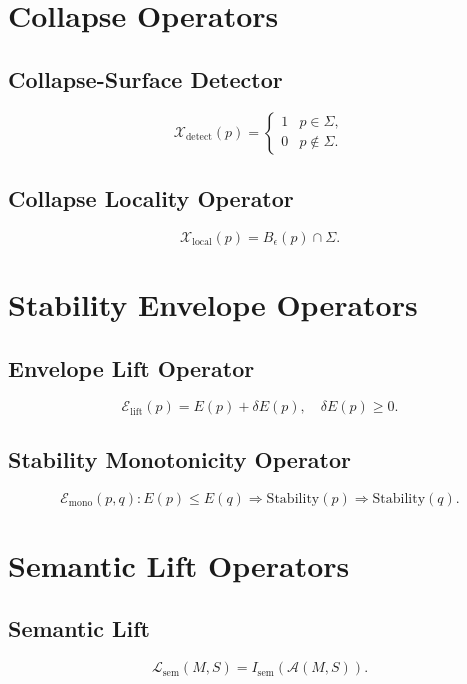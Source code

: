 \documentclass[11pt]{article}
\begin{document}
\section{Collapse Operators}

\subsection{Collapse-Surface Detector}
\[
\mathcal{X}_{\mathrm{detect}}(p)
  = \begin{cases}
      1 & p \in \Sigma,\\
      0 & p \notin \Sigma.
    \end{cases}
\]

\subsection{Collapse Locality Operator}
\[
\mathcal{X}_{\mathrm{local}}(p)
  = B_\epsilon(p) \cap \Sigma.
\]

\section{Stability Envelope Operators}

\subsection{Envelope Lift Operator}
\[
\mathcal{E}_{\mathrm{lift}}(p)
  = E(p) + \delta E(p),
\quad \delta E(p) \ge 0.
\]

\subsection{Stability Monotonicity Operator}
\[
\mathcal{E}_{\mathrm{mono}}(p,q) :
E(p) \le E(q) \Rightarrow
\mathrm{Stability}(p) \Rightarrow \mathrm{Stability}(q).
\]

\section{Semantic Lift Operators}

\subsection{Semantic Lift}
\[
\mathcal{L}_{\mathrm{sem}}(M,S)
  = I_{\mathrm{sem}}(\mathcal{A}(M,S)).
\]
\end{document}
